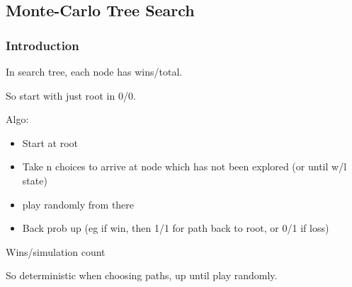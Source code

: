 
\subsection{Monte-Carlo Tree Search}

\subsubsection{Introduction}

In search tree, each node has wins/total.

So start with just root in 0/0.

Algo:

\begin{itemize}
\item Start at root
\item Take n choices to arrive at node which has not been explored (or until w/l state)
\item play randomly from there
\item Back prob up (eg if win, then 1/1 for path back to root, or 0/1 if loss)
\end{itemize}

Wins/simulation count

So deterministic when choosing paths, up until play randomly.

